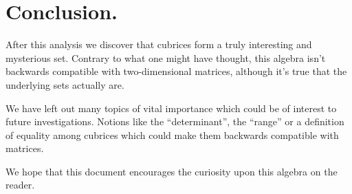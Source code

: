 \section{Conclusion.}

After this analysis we discover that cubrices form a truly interesting and mysterious set. Contrary to what one might have thought, this algebra isn't backwards compatible with two-dimensional matrices, although it's true that the underlying sets actually are.

We have left out many topics of vital importance which could be of interest to future investigations. Notions like the ``determinant'', the ``range'' or a definition of equality among cubrices which could make them backwards compatible with matrices.

We hope that this document encourages the curiosity upon this algebra on the reader.
